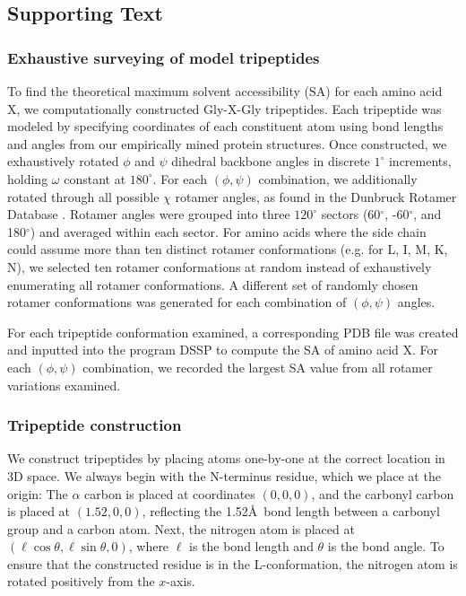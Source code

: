 \documentclass[12pt]{article}
\begin{document}
\newpage

\subsection*{Supporting Text}

\subsubsection*{Exhaustive surveying of model tripeptides}

To find the theoretical maximum solvent accessibility (SA) for each amino acid X, we computationally constructed Gly-X-Gly tripeptides. Each tripeptide was modeled by specifying coordinates of each constituent atom using bond lengths and angles from our empirically mined protein structures. Once constructed, we exhaustively rotated $\phi$ and $\psi$ dihedral backbone angles in discrete $1^\circ$ increments, holding $\omega$ constant at $180^\circ$. For each $(\phi, \psi)$ combination, we additionally rotated through all possible $\chi$ rotamer angles, as found in the Dunbruck Rotamer Database \cite{WangDunbrack2003}. Rotamer angles were grouped into three $120^\circ$ sectors (60$^\circ$, -60$^\circ$, and 180$^\circ$) and averaged within each sector. For amino acids where the side chain could assume more than ten distinct rotamer conformations (e.g. for L, I, M, K, N), we selected ten rotamer conformations at random instead of exhaustively enumerating all rotamer conformations. A different set of randomly chosen rotamer conformations was generated for each combination of $(\phi, \psi)$ angles. 

For each tripeptide conformation examined, a corresponding PDB file was created and inputted into the program DSSP \cite{Kabsch1983} to compute the SA of amino acid X. For each $(\phi, \psi)$ combination, we recorded the largest SA value from all rotamer variations examined.

\subsubsection*{Tripeptide construction}

We construct tripeptides by placing atoms one-by-one at the correct location in 3D space. We always begin with the N-terminus residue, which we place at the origin: The $\alpha$ carbon is placed at coordinates $(0,0,0)$, and the carbonyl carbon is placed at $(1.52, 0, 0)$, reflecting the 1.52\AA\ bond length between a carbonyl group and a carbon atom. Next, the nitrogen atom is placed at $(\ell \cos{\theta}, \ell \sin{\theta}, 0)$, where $\ell$ is the bond length and $\theta$ is the bond angle. To ensure that the constructed residue is in the L-conformation, the nitrogen atom is rotated positively from the $x$-axis. 
\end{document}
